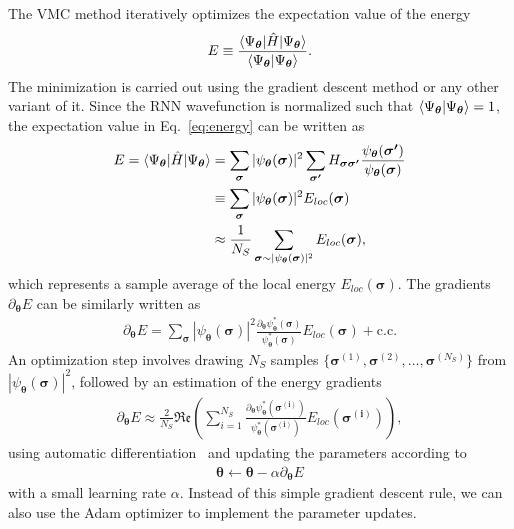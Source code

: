 \documentclass[twocolumn,english,reprint,superscriptaddress,longbibliography,pra]{revtex4-1}
\begin{document}
The  VMC method iteratively optimizes the expectation value of the
energy
\begin{align}
  E \equiv \frac{\braket{\Psi_{\bm{\theta}}|\hat{H}|\Psi_{\bm{\theta}}}}{\braket{\Psi_{\bm{\theta}}|\Psi_{\bm{\theta}}}}.\label{eq:energy}
\end{align}
The minimization is carried out using the gradient descent method or any other variant of it. Since the RNN wavefunction is normalized such that $\braket{\Psi_{\bm{\theta}}|\Psi_{\bm{\theta}}}=1$, the expectation value in Eq.~\ref{eq:energy} can be written as
\begin{align}
  E = \braket{\Psi_{\bm{\theta}} |\hat{H}|\Psi_{\bm{\theta}}}
  &=\sum_{\bm{\sigma}} |\psi_{\bm{\theta}}(\bm{\sigma})|^2\sum_{\bm{\sigma'}} H_{\bm{\sigma\sigma'}}\frac{\psi_{\bm{\theta}}(\bm{\sigma'})}{\psi_{\bm{\theta}}(\bm{\sigma})} \nonumber \\
  &\equiv \sum_{\bm{\sigma}} |\psi_{\bm{\theta}}(\bm{\sigma})|^2E_{loc}(\bm{\sigma}) \nonumber \\
   &\approx \frac{1}{N_S}\sum_{\bm{\sigma} \sim |\psi_{\bm{\theta}}(\bm{\sigma})|^2} E_{loc}(\bm{\sigma}),
  \label{eq:expectation_value} 
\end{align}
which represents a sample average of the local energy $E_{loc}(\bm{\sigma})$. The gradients $\partial_{{\bm{\theta}}}E$ can be similarly written as
\begin{align}
  \partial_{{\bm{\theta}}} E =
  \sum_{\bm{\sigma}} |\psi_{\bm{\theta}}(\bm{\sigma})|^2\frac{\partial_{{\bm{\theta}}}\psi^{*}_{\bm{\theta}}(\bm{\sigma})}{\psi^{*}_{\bm{\theta}}(\bm{\sigma})} E_{loc}(\bm{\sigma})  + \text{c.c}.
  \label{eq:gradient}
\end{align}
An optimization step involves drawing $N_S$ samples $\{ \bm{\sigma}^{(1)}, \bm{\sigma}^{(2)}, \ldots, \bm{\sigma}^{(N_S)}\}$ from $|\psi_{\bm{\theta}}(\bm{\sigma})|^2$, followed by an estimation of the energy gradients 
\begin{align}
\partial_{{\bm{\theta}}} E \approx
\frac{2}{N_S} \mathfrak{Re} \left ( \sum_{i=1}^{N_S}  \frac{\partial_{{\bm{\theta}}}\psi^{*}_{\bm{\theta}}(\bm{\sigma^{(i)}})}{\psi^{*}_{\bm{\theta}}(\bm{\sigma^{(i)}})} E_{loc}(\bm{\sigma^{(i)}}) \right),
\label{eq:stochastic_gradient1}
\end{align}
using automatic differentiation~\cite{AD_2017} and updating the parameters according to
\begin{align}
  {\bm{\theta}} \leftarrow {\bm{\theta}} - \alpha \partial_{{\bm{\theta}}}E
  \label{eq:gradient_descent}
\end{align}
with a small learning rate $\alpha$. Instead of this simple gradient descent rule, we can also use the Adam optimizer \cite{2014arXiv1412.6980K} to implement the parameter updates.
\end{document}
